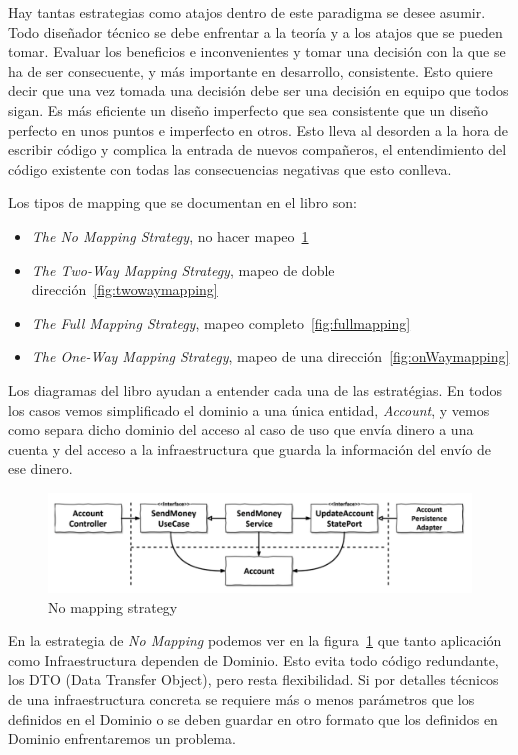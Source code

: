 Hay tantas estrategias como atajos dentro de este paradigma se desee asumir.
Todo diseñador técnico se debe enfrentar a la teoría y a los atajos que se pueden tomar.
Evaluar los beneficios e inconvenientes y tomar una decisión con la que se ha de ser consecuente, y más importante en desarrollo, consistente.
Esto quiere decir que una vez tomada una decisión debe ser una decisión en equipo que todos sigan.
Es más eficiente un diseño imperfecto que sea consistente que un diseño perfecto en unos puntos e imperfecto en otros.
Esto lleva al desorden a la hora de escribir código y complica la entrada de nuevos compañeros, el entendimiento del código existente con todas las consecuencias negativas que esto conlleva.

Los tipos de mapping que se documentan en el libro\cite{TomHombergs2019GYHD} son:
\begin{itemize}
    \item \textit{The No Mapping Strategy}, no hacer mapeo~\cref{fig:nomapping}
    \item \textit{The Two-Way Mapping Strategy}, mapeo de doble dirección~\cref{fig:twowaymapping}
    \item \textit{The Full Mapping Strategy}, mapeo completo~\cref{fig:fullmapping}
    \item \textit{The One-Way Mapping Strategy}, mapeo de una dirección~\cref{fig:onWaymapping}
\end{itemize}

Los diagramas del libro ayudan a entender cada una de las estratégias.
En todos los casos vemos simplificado el dominio a una única entidad, \textit{Account}, y vemos como separa dicho dominio del acceso al caso de uso que envía dinero a una cuenta y del acceso a la infraestructura que guarda la información del envío de ese dinero.

\begin{figure}[H]
    \centering
    \includegraphics[height=0.1\textheight]{./part/Ejecucion/Seguimiento/CreateTaskUseCase/img/nomapping}
    \caption{No mapping strategy~\cite{TomHombergs2019GYHD}}\label{fig:nomapping}
\end{figure}

En la estrategia de \textit{No Mapping} podemos ver en la figura~\cref{fig:nomapping} que tanto aplicación como Infraestructura dependen de Dominio.
Esto evita todo código redundante, los \gls{DTO} (Data Transfer Object), pero resta flexibilidad.
Si por detalles técnicos de una infraestructura concreta se requiere más o menos parámetros que los definidos en el Dominio o se deben guardar en otro formato que los definidos en Dominio enfrentaremos un problema.

